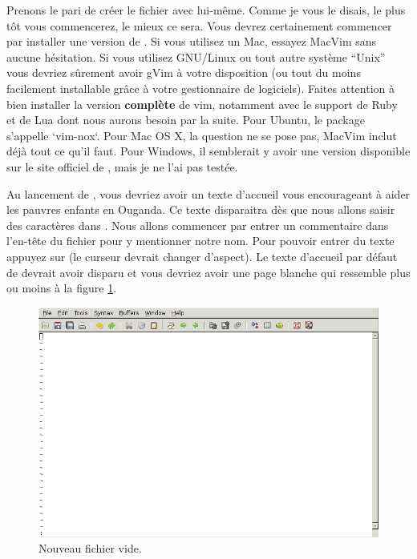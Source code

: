 Prenons le pari de créer le fichier \vimrc avec \vim lui-même. Comme je vous le disais, le plus tôt vous commencerez, le mieux ce sera.
Vous devrez certainement commencer par installer une version de \vim. Si vous utilisez un Mac, essayez MacVim  sans aucune hésitation. Si vous utilisez GNU/Linux ou tout autre système ``Unix'' vous devriez sûrement avoir gVim à votre disposition (ou tout du moins facilement installable grâce à votre gestionnaire de logiciels). Faites attention à bien installer la version \textbf{complète} de vim, notamment avec le support de Ruby et de Lua dont nous aurons besoin par la suite. Pour Ubuntu, le package s'appelle `vim-nox`. Pour Mac OS X, la question ne se pose pas, MacVim inclut déjà tout ce qu'il faut. Pour Windows, il semblerait y avoir une version disponible sur le site officiel de \vim{}, mais je ne l'ai pas testée.

Au lancement de \vim, vous devriez avoir un texte d'accueil vous encourageant à aider les pauvres enfants en Ouganda. Ce texte disparaitra dès que nous allons saisir des caractères dans \vim. Nous allons commencer par entrer un commentaire dans l'en-tête du fichier pour y mentionner notre nom. Pour pouvoir entrer du texte appuyez sur \tti (le curseur devrait changer d'aspect). Le texte d'accueil par défaut de \vim devrait avoir disparu et vous devriez avoir une page blanche qui ressemble plus ou moins à la figure \ref{fig:vim-new}. 

\begin{figure}%
  \includegraphics[width=\linewidth]{graphics/vim-new.png}
  \caption{Nouveau fichier vide.}
  \label{fig:vim-new}
\end{figure}

